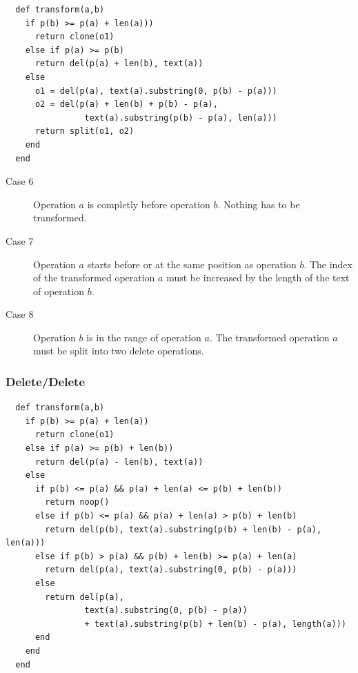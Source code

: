\small{\begin{verbatim}
  def transform(a,b)
    if p(b) >= p(a) + len(a)))
      return clone(o1)
    else if p(a) >= p(b)
      return del(p(a) + len(b), text(a))
    else
      o1 = del(p(a), text(a).substring(0, p(b) - p(a)))
      o2 = del(p(a) + len(b) + p(b) - p(a), 
                text(a).substring(p(b) - p(a), len(a)))
      return split(o1, o2)
    end
  end
\end{verbatim}}

\begin{description}
 \item[Case 6] Operation $a$ is completly before operation $b$. Nothing has to be transformed.
 \item[Case 7] Operation $a$ starts before or at the same position as operation $b$. The index of the transformed operation $a$ must be increased by the length of the text of operation $b$.
 \item[Case 8] Operation $b$ is in the range of operation $a$. The transformed operation $a$ must be split into two delete operations.
\end{description}


\subsubsection{Delete/Delete}

\small{\begin{verbatim}
  def transform(a,b)
    if p(b) >= p(a) + len(a))
      return clone(o1)
    else if p(a) >= p(b) + len(b))
      return del(p(a) - len(b), text(a))
    else
      if p(b) <= p(a) && p(a) + len(a) <= p(b) + len(b))
        return noop()
      else if p(b) <= p(a) && p(a) + len(a) > p(b) + len(b)
        return del(p(b), text(a).substring(p(b) + len(b) - p(a), len(a)))
      else if p(b) > p(a) && p(b) + len(b) >= p(a) + len(a)
        return del(p(a), text(a).substring(0, p(b) - p(a)))
      else
        return del(p(a), 
                text(a).substring(0, p(b) - p(a)) 
                + text(a).substring(p(b) + len(b) - p(a), length(a)))
      end
    end
  end
\end{verbatim}}

